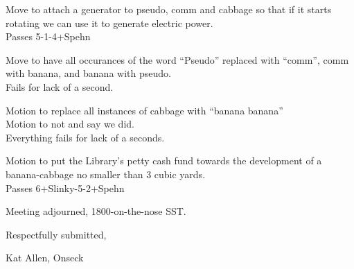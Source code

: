 \documentclass[10pt]{article}
\begin{document}
Move to attach a generator to pseudo, comm and cabbage so that if it
starts rotating we can use it to generate electric power.\\
Passes 5-1-4+Spehn

Move to have all occurances of the word ``Pseudo'' replaced with
``comm'', comm with banana, and banana with pseudo.\\
Fails for lack of a second.

Motion to replace all instances of cabbage with ``banana banana''\\
Motion to not and say we did.\\
Everything fails for lack of a seconds.

Motion to put the Library's petty cash fund towards the development of
a banana-cabbage no smaller than 3 cubic yards.\\
Passes 6+Slinky-5-2+Spehn


\vspace{12pt}

\noindent
Meeting adjourned, 1800-on-the-nose SST.

\vspace{18pt}

\centerline{Respectfully submitted,}
\centerline{Kat Allen,  Onseck}
\end{document}
